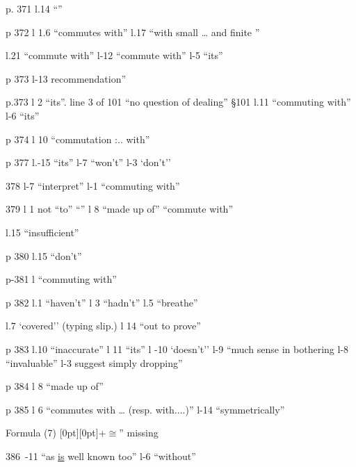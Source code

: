 
p. 371 l.14 ``''

p 372 l 1.6 ``commutes with'' \quad l.17 ``with small \ldots{} and finite ''

l.21 ``commute with'' \quad l-12 ``commute with'' \quad l-5 ``its''

p 373 l-13 recommendation''

p.373 l 2 ``its''. \quad line 3 of 101 ``no question of dealing'' \quad \S101 l.11 ``commuting with'' \quad l-6 ``its''

p 374 l 10 ``commutation :.. with''

p 377 l.-15 ``its'' \quad l-7 ``won't'' \quad l-3 `don't''

378 l-7 ``interpret'' \quad l-1 ``commuting with''

379 l 1 not ``to'' ``'' \quad l 8 ``made up of'' \quad ``commute with''

l.15 ``insufficient''

p 380 l.15 ``don't''

p-381 l ``commuting with''

p 382 l.1 ``haven't'' \quad l 3 ``hadn't'' \quad l.5 ``breathe''

l.7 `covered'' (typing slip.) \quad l 14 ``out to prove''

p 383 l.10 ``inaccurate'' \quad l 11 ``its'' \quad l -10 `doesn't'' \quad l-9 ``much sense in bothering \quad l-8 ``invaluable'' \quad l-3 suggest simply dropping''

p 384 l 8 ``made up of''

p 385 l 6 ``commutes with \ldots{} (resp. with....)'' \quad l-14 ``symmetrically''

Formula (7) \raisebox{1.1ex}[0pt][0pt]{$+$}$\cong$'' missing

386 \,-11 ``as \uline{is} well known too'' \quad l-6 ``without''

